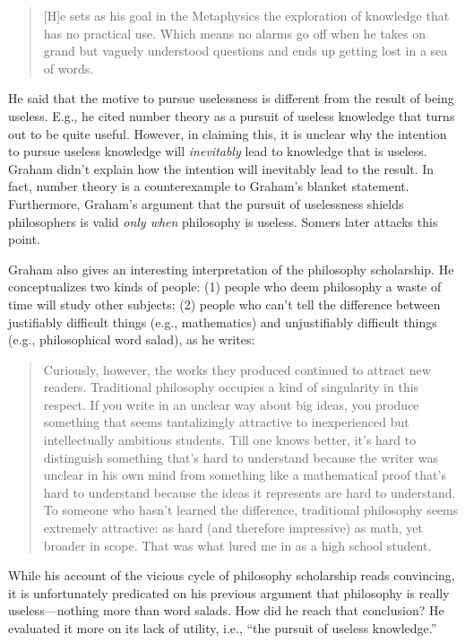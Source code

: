 \documentclass[12pt]{article}
\begin{document}
\begin{quotation}
 [H]e sets as his goal in the Metaphysics the exploration of knowledge that has no practical use. Which means no alarms go off when he takes on grand but vaguely understood questions and ends up getting lost in a sea of words.
\end{quotation}

He said that the motive to pursue uselessness is different from the result of being useless. E.g., he cited number theory as a pursuit of useless knowledge that turns out to be quite useful. However, in claiming this, it is unclear why the intention to pursue useless knowledge will \emph{inevitably} lead to knowledge that is useless. Graham didn't explain how the intention will inevitably lead to the result. In fact, number theory is a counterexample to Graham's blanket statement. Furthermore, Graham's argument that the pursuit of uselessness shields philosophers is valid \emph{only when} philosophy is useless. Somers later attacks this point.

Graham also gives an interesting interpretation of the philosophy scholarship. He conceptualizes two kinds of people: (1) people who deem philosophy a waste of time will study other subjects; (2) people who can't tell the difference between justifiably difficult things (e.g., mathematics) and unjustifiably difficult things (e.g., philosophical word salad), as he writes:

\begin{quotation}
 Curiously, however, the works they produced continued to attract new readers. Traditional philosophy occupies a kind of singularity in this respect. If you write in an unclear way about big ideas, you produce something that seems tantalizingly attractive to inexperienced but intellectually ambitious students. Till one knows better, it's hard to distinguish something that's hard to understand because the writer was unclear in his own mind from something like a mathematical proof that's hard to understand because the ideas it represents are hard to understand. To someone who hasn't learned the difference, traditional philosophy seems extremely attractive: as hard (and therefore impressive) as math, yet broader in scope. That was what lured me in as a high school student.
\end{quotation}

While his account of the vicious cycle of philosophy scholarship reads convincing, it is unfortunately predicated on his previous argument that philosophy is really useless---nothing more than word salads. How did he reach that conclusion? He evaluated it more on its lack of utility, i.e., \enquote{the pursuit of useless knowledge.}
\end{document}
